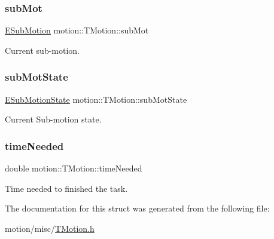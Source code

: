 \subsubsection{\texorpdfstring{sub\+Mot}{subMot}}
{\footnotesize\ttfamily \mbox{\hyperlink{motionEnums_8h_a23be5ef75af9219a8bf688fd9716d72c}{E\+Sub\+Motion}} motion\+::\+T\+Motion\+::sub\+Mot}

Current sub-\/motion. \mbox{\label{structmotion_1_1TMotion_a867be2dd284ef064809db4e384a722b2}} 
\subsubsection{\texorpdfstring{sub\+Mot\+State}{subMotState}}
{\footnotesize\ttfamily \mbox{\hyperlink{motionEnums_8h_a272f94c6143b9acf7ac44f165be53948}{E\+Sub\+Motion\+State}} motion\+::\+T\+Motion\+::sub\+Mot\+State}

Current Sub-\/motion state. \mbox{\label{structmotion_1_1TMotion_a927510756a7eb9cacae2fcea8ded4dc5}} 
\subsubsection{\texorpdfstring{time\+Needed}{timeNeeded}}
{\footnotesize\ttfamily double motion\+::\+T\+Motion\+::time\+Needed}

Time needed to finished the task. 

The documentation for this struct was generated from the following file\+:\begin{DoxyCompactItemize}
\item 
motion/misc/\mbox{\hyperlink{TMotion_8h}{T\+Motion.\+h}}\end{DoxyCompactItemize}
